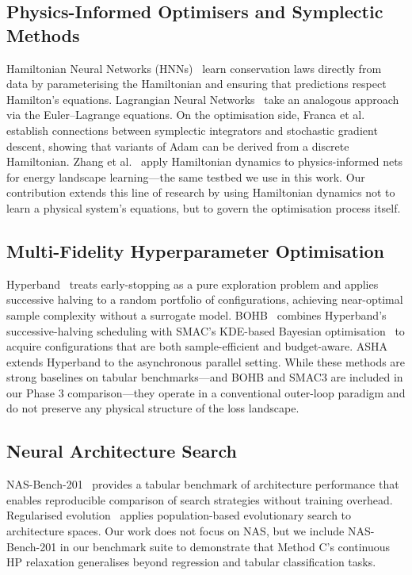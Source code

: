 \documentclass[12pt,a4paper]{article}
\begin{document}
\subsection{Physics-Informed Optimisers and Symplectic Methods}

Hamiltonian Neural Networks (HNNs)~\cite{greydanus2019} learn
conservation laws directly from data by parameterising the Hamiltonian
and ensuring that predictions respect Hamilton's equations.  Lagrangian
Neural Networks~\cite{cranmer2020} take an analogous approach via the
Euler--Lagrange equations.  On the optimisation side, Franca et
al.~\cite{franca2020} establish connections between symplectic
integrators and stochastic gradient descent, showing that variants of
Adam can be derived from a discrete Hamiltonian.  Zhang et
al.~\cite{zhang2025} apply Hamiltonian dynamics to physics-informed
nets for energy landscape learning—the same testbed we use in this
work.  Our contribution extends this line of research by using
Hamiltonian dynamics not to learn a physical system's equations, but
to govern the optimisation process itself.

\subsection{Multi-Fidelity Hyperparameter Optimisation}

Hyperband~\cite{li2018hyperband} treats early-stopping as a pure
exploration problem and applies successive halving to a random
portfolio of configurations, achieving near-optimal sample complexity
without a surrogate model.  BOHB~\cite{falkner2018bohb} combines
Hyperband's successive-halving scheduling with SMAC's KDE-based
Bayesian optimisation~\cite{bergstra2011tpe} to acquire configurations
that are both sample-efficient and budget-aware.  ASHA~\cite{li2020asha}
extends Hyperband to the asynchronous parallel setting.  While these
methods are strong baselines on tabular benchmarks—and BOHB and SMAC3
are included in our Phase 3 comparison—they operate in a conventional
outer-loop paradigm and do not preserve any physical structure of the
loss landscape.

\subsection{Neural Architecture Search}

NAS-Bench-201~\cite{dong2020nasbench201} provides a tabular benchmark
of architecture performance that enables reproducible comparison of
search strategies without training overhead.  Regularised
evolution~\cite{real2019regularized} applies population-based
evolutionary search to architecture spaces.  Our work does not focus
on NAS, but we include NAS-Bench-201 in our benchmark suite to
demonstrate that Method C's continuous HP relaxation generalises
beyond regression and tabular classification tasks.
\end{document}
